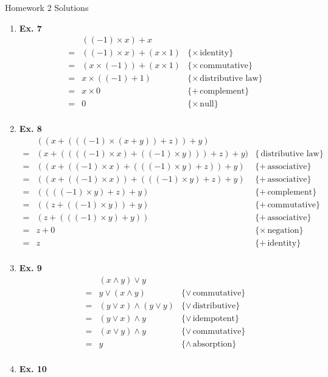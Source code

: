 \documentclass[fleqn]{article}
\newenvironment{proof}
  {\[\begin{array}{lll}}
  {\end{array}\]}
\newcommand{\law}[2][\!]{\{{#1\,}\mbox{{#2}}\}}
\begin{document}
  \begin{center}
    {\Large Homework 2 Solutions}
  \end{center}
  \begin{enumerate}
      \item
      \textbf{ Ex. 7 }
      \begin{proof}
          & ((-1)\times x) + x & \\
        = & ((-1) \times x) + (x \times 1) & \law[\times]{identity} \\
        = & (x \times (-1)) + (x \times 1) & \law[\times]{commutative} \\
        = & x \times ((-1) + 1)            & \law[\times]{distributive law} \\
        = & x \times 0                     & \law[+]{complement} \\
        = & 0                              & \law[\times]{null} \\
        \end{proof}
    \item
      \textbf{ Ex. 8 }
      \begin{proof}
          & ((x + (((-1) \times (x + y)) + z)) + y) & \\
        = & (x + ((((-1)\times x) + ((-1) \times y))) + z) + y) & \law{distributive law} \\
        = & ((x + ((-1)\times x) + (((-1)\times y) + z)) + y) & \law[+]{associative} \\
        = & ((x + ((-1)\times x)) + (((-1)\times y) + z) + y) & \law[+]{associative} \\
        = & ((((-1)\times y) + z) + y) & \law[+]{complement}  \\
        = & ((z + ((-1)\times y)) + y) & \law[+]{commutative} \\
        = & (z + (((-1)\times y) + y)) & \law[+]{associative} \\
        = & z + 0                      & \law[\times]{negation}  \\
        = & z                          & \law[+]{identity}  \\
        \end{proof}
    \item
      \textbf{ Ex. 9 }
      \begin{proof}
          & (x \wedge y) \vee y & \\
        = & y \vee (x \wedge y) & \law[\vee]{commutative} \\
        = & (y \vee x) \wedge (y \vee y) & \law[\vee]{distributive} \\
        = & (y \vee x) \wedge y & \law[\vee]{idempotent} \\
        = & (x \vee y) \wedge y & \law[\vee]{commutative} \\
        = & y & \law[\wedge]{absorption} \\
      \end{proof}
    \item
      \textbf{ Ex. 10 }


\end{enumerate}
\end{document}
